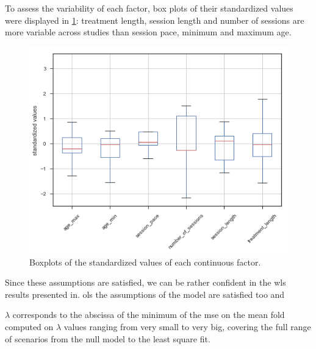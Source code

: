 \documentclass[12pt,a4paper,english]{article}
\begin{document}
		
		
To assess the variability of each factor, box plots of their standardized values were displayed in \cref{Figure:factors_analysis_boxplots}: treatment length, 
session length and number of sessions are more variable across studies than session pace, minimum and maximum age.  

\begin{figure}[h!]
  \centering
  \includegraphics[scale=0.5]{figures/factors_analysis_boxplot_no_colors_no_two_columns}
  \caption{Boxplots of the standardized values of each continuous factor.}
  \label{Figure:factors_analysis_boxplots}
\end{figure}



Since these assumptions are satisfied, we can be rather confident in the \gls{wls} results presented in. ols the assumptions of the 
model are satisfied too and

$\lambda$ corresponds to the abscissa of the minimum of the \gls{mse} on the mean fold computed on $\lambda$ values ranging from very 
small to very big, covering the full range of scenarios from the null model to the least square fit.

\clearpage


\end{document}
